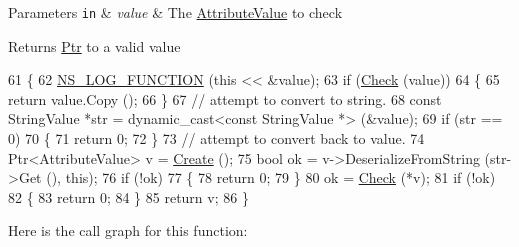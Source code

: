 \begin{DoxyParams}[1]{Parameters}
\mbox{\tt in}  & {\em value} & The \hyperlink{classns3_1_1AttributeValue}{Attribute\+Value} to check \\
\hline
\end{DoxyParams}
\begin{DoxyReturn}{Returns}
\hyperlink{classns3_1_1Ptr}{Ptr} to a valid value 
\end{DoxyReturn}

\begin{DoxyCode}
61 \{
62   \hyperlink{log-macros-disabled_8h_a90b90d5bad1f39cb1b64923ea94c0761}{NS\_LOG\_FUNCTION} (\textcolor{keyword}{this} << &value);
63   \textcolor{keywordflow}{if} (\hyperlink{classns3_1_1AttributeChecker_a3b0cdc0ac70282a7762605181439dfe4}{Check} (value))
64     \{
65       \textcolor{keywordflow}{return} value.Copy ();
66     \}
67   \textcolor{comment}{// attempt to convert to string.}
68   \textcolor{keyword}{const} StringValue *str = \textcolor{keyword}{dynamic\_cast<}\textcolor{keyword}{const }StringValue *\textcolor{keyword}{>} (&value);
69   \textcolor{keywordflow}{if} (str == 0)
70     \{
71       \textcolor{keywordflow}{return} 0;
72     \}
73   \textcolor{comment}{// attempt to convert back to value.}
74   Ptr<AttributeValue> v = \hyperlink{classns3_1_1AttributeChecker_a034af3ccac738b21e0d62e4191c241de}{Create} ();
75   \textcolor{keywordtype}{bool} ok = v->DeserializeFromString (str->Get (), \textcolor{keyword}{this});
76   \textcolor{keywordflow}{if} (!ok)
77     \{
78       \textcolor{keywordflow}{return} 0;
79     \}
80   ok = \hyperlink{classns3_1_1AttributeChecker_a3b0cdc0ac70282a7762605181439dfe4}{Check} (*v);
81   \textcolor{keywordflow}{if} (!ok)
82     \{
83       \textcolor{keywordflow}{return} 0;
84     \}
85   \textcolor{keywordflow}{return} v;
86 \}
\end{DoxyCode}


Here is the call graph for this function\+:


